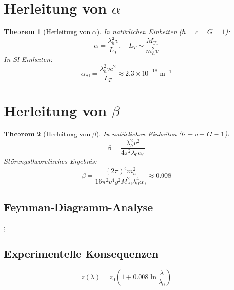 \documentclass{article}
\newcommand{\Mpl}{M_{\text{Pl}}}
\newtheorem{theorem}{Theorem}[section]
\begin{document}
	\section{Herleitung von \(\alpha\)}
	\begin{theorem}[Herleitung von \(\alpha\)]
		In natürlichen Einheiten (\(\hbar = c = G = 1\)):
		\begin{equation}
			\alpha = \frac{\lambda_h^2 v}{L_T}, \quad L_T \sim \frac{\Mpl}{m_h^2 v}
		\end{equation}
		In SI-Einheiten:
		\begin{equation}
			\alpha_{\text{SI}} = \frac{\lambda_h^2 v c^2}{L_T} \approx 2.3 \times 10^{-18} \text{ m}^{-1}
		\end{equation}
	\end{theorem}
	
	\section{Herleitung von \(\beta\)}
	\begin{theorem}[Herleitung von \(\beta\)]
		In natürlichen Einheiten (\(\hbar = c = G = 1\)):
		\begin{equation}
			\beta = \frac{\lambda_h^2 v^2}{4\pi^2 \lambda_0 \alpha_0}
		\end{equation}
		Störungstheoretisches Ergebnis:
		\begin{equation}
			\beta = \frac{(2\pi)^4 m_h^2}{16 \pi^2 v^4 y^2 \Mpl^2 \lambda_0^4 \alpha_0} \approx 0.008
		\end{equation}
	\end{theorem}
	
	\subsection{Feynman-Diagramm-Analyse}
	\begin{center}
		;
	\end{center}
	
	\subsection{Experimentelle Konsequenzen}
	\begin{equation}
		z(\lambda) = z_0 \left(1 + 0.008 \ln \frac{\lambda}{\lambda_0}\right)
	\end{equation}
	
\end{document}
